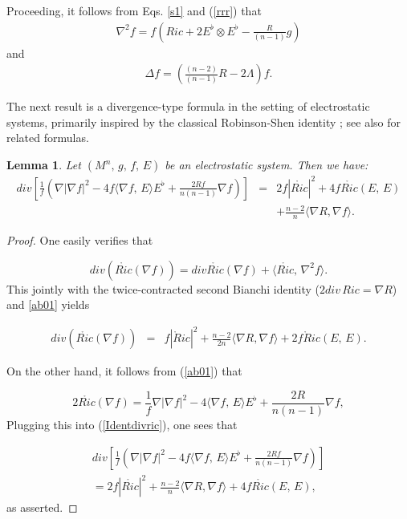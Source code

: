 \documentclass{amsart}
\newtheorem{lemma}{Lemma}
\numberwithin{equation}{section}
\begin{document}
Proceeding, it follows from Eqs. \eqref{s1} and (\ref{rrr}) that 
\begin{eqnarray}\label{ab01}
\nabla^{2} f = f\left(Ric + 2E^{\flat}\otimes E^{\flat} - \frac{R}{(n-1)}g\right)
\end{eqnarray}
and 
\begin{eqnarray}\label{ab02}
\Delta f = \left(\frac{(n-2)}{(n-1)}R - 2\Lambda\right)f.
\end{eqnarray}

The next result is a divergence-type formula in the setting of electrostatic systems, primarily inspired by the classical Robinson-Shen identity \cite{sh}; see also \cite{leandro2023, leandro2024} for related formulas.

	
\begin{lemma}
\label{lemmaAk}
Let $(M^{n},\,g,\,f,\,E)$ be an electrostatic system. Then we have:
		\begin{eqnarray}\label{notnew}
			div \left[\frac{1}{f}\left(\nabla|\nabla f|^2  -4f\langle\nabla f,\,E\rangle E^{\flat} + \frac{2Rf}{n(n-1)}\nabla f\right)\right]&=& 2f|\mathring{Ric}|^2 + 4f\mathring{Ric}(E,\,E) \nonumber\\&&+ \frac{n-2}{n}\langle\nabla R,\nabla f\rangle .
		\end{eqnarray}
	\end{lemma}
	
	
	
	\begin{proof}
	One easily verifies that 
	
	$$div (\mathring{Ric}(\nabla f))=div\mathring{Ric}(\nabla f)+\langle \mathring{Ric},\,\nabla^{2}f\rangle.$$ This jointly with the twice-contracted second Bianchi identity ($2div\,Ric=\nabla R$) and \eqref{ab01} yields
	
	
	\begin{eqnarray}
			\label{Identdivric}
			div (\mathring{Ric}(\nabla f))&=& f|\mathring{R}ic|^2+\frac{n-2}{2n}\langle\nabla R,\nabla f\rangle + 2f\mathring{R}ic(E,\,E).
		\end{eqnarray}
	
	On the other hand, it follows from (\ref{ab01}) that 
	
		\begin{equation}
			\label{RSTipeIdentityEq1}
			2\mathring{Ric}(\nabla f)=\frac{1}{f}\nabla|\nabla f|^2  -4\langle\nabla f,\,E\rangle E^{\flat} + \frac{2R}{n(n-1)}\nabla f,
		\end{equation}  Plugging this into (\ref{Identdivric}), one sees that
		
		
		\begin{eqnarray*}
			div \left[\frac{1}{f}\left(\nabla|\nabla f|^2  - 4f\langle\nabla f,\,E\rangle E^{\flat} + \frac{2Rf}{n(n-1)}\nabla f\right)\right]\nonumber\\ =2f|\mathring{Ric}|^2+\frac{n-2}{n}\langle\nabla R,\nabla f\rangle + 4f\mathring{Ric}(E,\,E),
		\end{eqnarray*}  as asserted. 
	\end{proof}
	
\end{document}
